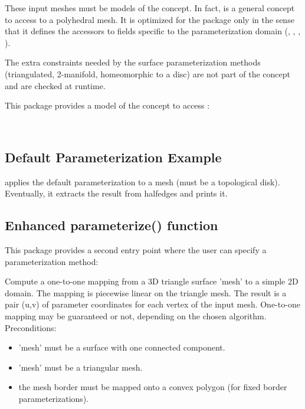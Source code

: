 These input meshes must be models of the  concept.
In fact,  is a general concept to access to a
polyhedral mesh.
It is optimized for the  package
only in the sense that it
defines the accessors to fields specific to the parameterization domain
(, , , ).

The extra constraints  needed by the surface parameterization methods (triangulated,
2-manifold, homeomorphic to a disc) are not part of the concept and
are checked at runtime.

This package provides a model of the  concept
to access :

  \\


\subsection{Default Parameterization Example}

 applies the default parameterization to a
 mesh (must be a topological disk).
Eventually, it extracts the result from halfedges and prints it.



\subsection{Enhanced parameterize() function}

This package provides a second  entry point
where the user can specify a parameterization method:

{
Compute a one-to-one mapping from a 3D triangle surface 'mesh' to a simple 2D domain. The mapping is piecewise linear on the triangle mesh. The result is a pair (u,v) of parameter coordinates for each vertex of the input mesh.
One-to-one mapping may be guaranteed or not, depending on the chosen  algorithm.
Preconditions:\begin{itemize}
\item 'mesh' must be a surface with one connected component.\item 'mesh' must be a triangular mesh.\item the mesh border must be mapped onto a convex polygon (for fixed border parameterizations).\end{itemize}
}


